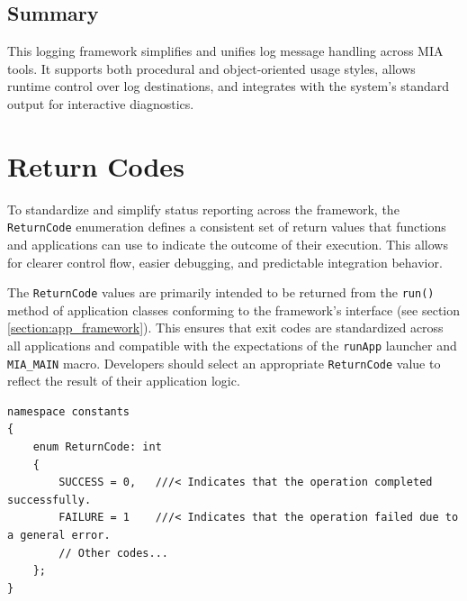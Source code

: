 \subsection{Summary}
This logging framework simplifies and unifies log message handling across MIA tools. It supports both procedural and object-oriented usage styles, allows runtime control over log destinations, and integrates with the system's standard output for interactive diagnostics.
































\section{Return Codes}
\label{section:return_codes}

To standardize and simplify status reporting across the framework, the \texttt{ReturnCode} enumeration defines a consistent set of return values that functions and applications can use to indicate the outcome of their execution. This allows for clearer control flow, easier debugging, and predictable integration behavior.

The \texttt{ReturnCode} values are primarily intended to be returned from the \texttt{run()} method of application classes conforming to the framework's interface (see section \ref{section:app_framework}). This ensures that exit codes are standardized across all applications and compatible with the expectations of the \texttt{runApp} launcher and \texttt{MIA\_MAIN} macro. Developers should select an appropriate \texttt{ReturnCode} value to reflect the result of their application logic.

\begin{lstlisting}[style=cppstyle]
namespace constants
{
	enum ReturnCode: int
	{
		SUCCESS = 0,   ///< Indicates that the operation completed successfully.
		FAILURE = 1    ///< Indicates that the operation failed due to a general error.
		// Other codes...
	};
}
\end{lstlisting}

